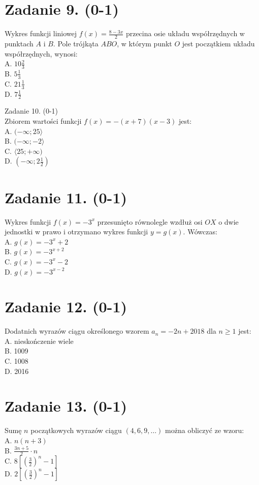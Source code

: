 \documentclass[10pt]{article}
\begin{document}
\section*{Zadanie 9. (0-1)}
Wykres funkcji liniowej \(f(x)=\frac{8-3 x}{2}\) przecina osie układu współrzędnych w punktach \(A\) i \(B\). Pole trójkąta \(A B O\), w którym punkt \(O\) jest początkiem układu współrzędnych, wynosi:\\
A. \(10 \frac{2}{3}\)\\
B. \(5 \frac{1}{3}\)\\
C. \(21 \frac{1}{3}\)\\
D. \(7 \frac{1}{2}\)

Zadanie 10. (0-1)\\
Zbiorem wartości funkcji \(f(x)=-(x+7)(x-3)\) jest:\\
A. \((-\infty ; 25\rangle\)\\
B. \((-\infty ;-2\rangle\)\\
C. \(\langle 25 ;+\infty)\)\\
D. \(\left(-\infty ; 2 \frac{1}{2}\right)\)

\section*{Zadanie 11. (0-1)}
Wykres funkcji \(f(x)=-3^{x}\) przesunięto równolegle wzdłuż osi \(O X\) o dwie jednostki w prawo i otrzymano wykres funkcji \(y=g(x)\). Wówczas:\\
A. \(g(x)=-3^{x}+2\)\\
B. \(g(x)=-3^{x+2}\)\\
C. \(g(x)=-3^{x}-2\)\\
D. \(g(x)=-3^{x-2}\)

\section*{Zadanie 12. (0-1)}
Dodatnich wyrazów ciągu określonego wzorem \(a_{n}=-2 n+2018\) dla \(n \geq 1\) jest:\\
A. nieskończenie wiele\\
B. 1009\\
C. 1008\\
D. 2016

\section*{Zadanie 13. (0-1)}
Sumę \(n\) początkowych wyrazów ciągu \((4,6,9, \ldots)\) można obliczyć ze wzoru:\\
A. \(n(n+3)\)\\
B. \(\frac{3 n+5}{2} \cdot n\)\\
C. \(8\left[\left(\frac{3}{2}\right)^{n}-1\right]\)\\
D. \(2\left[\left(\frac{3}{2}\right)^{n}-1\right]\)
\end{document}
